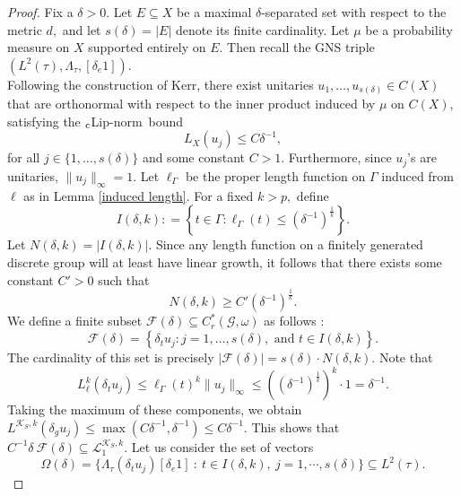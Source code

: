 \documentclass[a4paper,11pt,reqno]{amsart}
\theoremstyle{plain}
\theoremstyle{mainthmstyle}
\theoremstyle{named}
\numberwithin{equation}{section}
\newcommand{\Bea}{\begin{eqnarray*}}
\newcommand{\clipnorm}{$_{\text{\rm c}}$Lip-norm}
\begin{document}
\begin{proof}
Fix a $\delta > 0$. Let $E \subseteq X$ be a maximal $\delta$-separated set with respect to the metric $d,$ and let $s (\delta) = |E|$ denote its finite cardinality. Let $\mu$ be a probability measure on $X$ supported entirely on $E$. Then recall the GNS triple $(L^2(\tau), \Lambda_\tau, [\delta_e 1])$.\\

Following the construction of Kerr, there exist unitaries $u_1, \dots, u_{s (\delta)} \in C(X)$ that are orthonormal with respect to the inner product induced by $\mu$ on $C(X)$, satisfying the \clipnorm\ bound
$$L_X(u_j) \leq C \delta^{-1},$$
for all $j \in \{1, \dots, s(\delta)\}$ and some constant $C > 1$. Furthermore, since $u_j$'s are unitaries, $\|u_j\|_{\infty} = 1.$ Let $\ell_{\Gamma}$ be the proper length function on $\Gamma$ induced from $\ell$ as in Lemma \ref{induced length}. For a fixed $k > p,$ define
$$I(\delta, k) : = \left\{t \in \Gamma : \ell_{\Gamma} (t) \leq (\delta^{-1})^{\frac{1}{k}} \right\}.$$
Let $N(\delta, k) = |I(\delta, k)|$. Since any length function on a finitely generated discrete group will at least have linear growth, it follows that there exists some constant $C' > 0$ such that $$N (\delta, k) \geq C' \left (\delta^{-1} \right )^{\frac {1} {k}}.$$ We define a finite subset $\mathcal{F} (\delta) \subseteq C_r^{\ast} (\mathcal G, \omega)$ as follows $:$
$$\mathcal{F} (\delta) = \left\{ \delta_t u_j : j = 1, \dots, s (\delta), \text{ and } t \in I(\delta, k) \right\}.$$
The cardinality of this set is precisely $|\mathcal{F} (\delta)| = s (\delta) \cdot N(\delta, k).$ 
Note that
$$L_{\ell}^{k}(\delta_t u_j) \leq \ell_{\Gamma} (t)^k \|u_j\|_{\infty} \leq \left( (\delta^{-1})^{\frac{1}{k}} \right)^k \cdot 1 = \delta^{-1}.$$
Taking the maximum of these components, we obtain $L^{\mathcal{K}_S, k}(\delta_g u_j) \leq \max(C\delta^{-1}, \delta^{-1}) \le C \delta^{-1}$. This shows that $C^{-1} \delta\ \mathcal F (\delta) \subseteq \mathcal L^{\mathcal K_S, k}_1.$
Let us consider the set of vectors $$\Omega (\delta) = \{ \Lambda_\tau(\delta_t u_j)[\delta_e 1]\ :\ t \in I (\delta, k),\ j = 1, \cdots, s (\delta) \} \subseteq L^2(\tau).$$ 

\end{proof}
\end{document}
